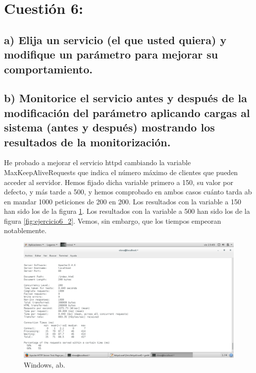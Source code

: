 
\section{Cuestión 6:}

\subsection{a) Elija un servicio (el que usted quiera) y modifique un parámetro para mejorar su comportamiento.}

\subsection{b) Monitorice el servicio antes y después de la modificación del parámetro aplicando cargas al sistema (antes y después) mostrando los resultados de la monitorización.}

He probado a mejorar el servicio httpd cambiando la variable MaxKeepAliveRequests que indica el 
número máximo de clientes que pueden acceder al servidor. Hemos fijado dicha variable 
primero a 150, su valor por defecto, y más tarde a 500, y hemos comprobado en ambos casos 
cuánto tarda ab en mandar 1000 peticiones de 200 en 200. Los resultados con la variable a 150 
han sido los de la figura \ref{fig:ejercicio6_1}. Los resultados con la variable a 500 han sido los de la figura \ref{fig:ejercicio6_2}. Vemos, sin embargo, que los tiempos empeoran notablemente.
 
\begin{figure}[H] 
	\centering
	\includegraphics[width=14.7cm]{./img/ejercicio6_1.png} 	
	\caption{Windows, ab.} \label{fig:ejercicio6_1}
\end{figure}



